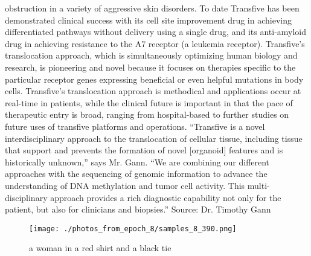 \documentclass{article}%
\begin{document}
obstruction in a variety of aggressive skin disorders. To date Transfive has been demonstrated clinical success with its cell site improvement drug in achieving differentiated pathways without delivery using a single drug, and its anti{-}amyloid drug in achieving resistance to the A7 receptor (a leukemia receptor). Transfive’s translocation approach, which is simultaneously optimizing human biology and research, is pioneering and novel because it focuses on therapies specific to the particular receptor genes expressing beneficial or even helpful mutations in body cells. Transfive’s translocation approach is methodical and applications occur at real{-}time in patients, while the clinical future is important in that the pace of therapeutic entry is broad, ranging from hospital{-}based to further studies on future uses of transfive platforms and operations. “Transfive is a novel interdisciplinary approach to the translocation of cellular tissue, including tissue that support and prevents the formation of novel {[}organoid{]} features and is historically unknown,” says Mr. Gann. “We are combining our different approaches with the sequencing of genomic information to advance the understanding of DNA methylation and tumor cell activity. This multi{-}disciplinary approach provides a rich diagnostic capability not only for the patient, but also for clinicians and biopsies.”\newline%
Source: Dr. Timothy Gann\newline%

%


\begin{figure}[h!]%
\centering%
\texttt{[image: ./photos\_from\_epoch\_8/samples\_8\_390.png]}%
\caption{a woman in a red shirt and a black tie}%
\end{figure}

%
\end{document}
